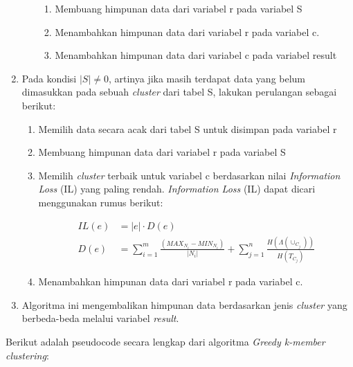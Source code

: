 \begin{enumerate}
\begin{enumerate}
\begin{enumerate}
\item Membuang himpunan data dari variabel r pada variabel S

\item Menambahkan himpunan data dari variabel r pada variabel c.

\item Menambahkan himpunan data dari variabel c pada variabel result

\end{enumerate}

\end{enumerate}

\item Pada kondisi $|S| \neq  0$, artinya jika masih terdapat data yang belum dimasukkan pada sebuah \textit{cluster} dari tabel S, lakukan perulangan sebagai berikut:

\begin{enumerate}
\item Memilih data secara acak dari tabel S untuk disimpan pada variabel r

\item Membuang himpunan data dari variabel r pada variabel S

\item Memilih \textit{cluster} terbaik untuk variabel c berdasarkan nilai \textit{Information Loss} (IL) yang paling rendah. \textit{Information Loss} (IL) dapat dicari menggunakan rumus berikut:

\begin{align*}
IL(e)&= |e| \cdot D(e) \\
D(e) &= \sum_{i=1}^{m} \frac{(MAX_{N_i} - MIN_{N_i})}{|N_i|} + \sum_{j=1}^{n}\frac{H(\Lambda(\cup_{C_j}))}{H(T_{C_j})}
\end{align*}

\item Menambahkan himpunan data dari variabel r pada variabel c.

\end{enumerate}

\item Algoritma ini mengembalikan himpunan data berdasarkan jenis \textit{cluster} yang berbeda-beda melalui variabel \textit{result}.

\end{enumerate}

\noindent Berikut adalah pseudocode secara lengkap dari algoritma \textit{Greedy k-member clustering}:

